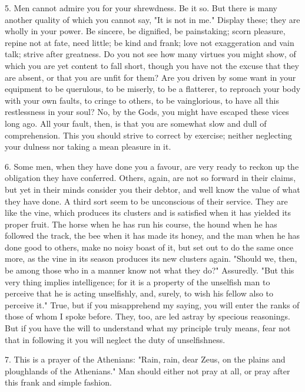 \documentclass{book}
\begin{document}
5. Men cannot admire you for your shrewdness. Be it so. But there is
many another quality of which you cannot say, "It is not in me."
Display these; they are wholly in your power. Be sincere, be
dignified, be painstaking; scorn pleasure, repine not at fate, need
little; be kind and frank; love not exaggeration and vain talk; strive
after greatness. Do you not see how many virtues you might show, of
which you are yet content to fall short, though you have not the
excuse that they are absent, or that you are unfit for them? Are you
driven by some want in your equipment to be querulous, to be miserly,
to be a flatterer, to reproach your body with your own faults, to
cringe to others, to be vainglorious, to have all this restlessness in
your soul? No, by the Gods, you might have escaped these vices long
ago. All your fault, then, is that you are somewhat slow and dull of
comprehension. This you should strive to correct by exercise; neither
neglecting your dulness nor taking a mean pleasure in it.

6. Some men, when they have done you a favour, are very ready to
reckon up the obligation they have conferred. Others, again, are not
so forward in their claims, but yet in their minds consider you their
debtor, and well know the value of what they have done. A third sort
seem to be unconscious of their service. They are like the vine, which
produces its clusters and is satisfied when it has yielded its proper
fruit. The horse when he has run his course, the hound when he has
followed the track, the bee when it has made its honey, and the man
when he has done good to others, make no noisy boast of it, but set
out to do the same once more, as the vine in its season produces its
new clusters again. "Should we, then, be among those who in a manner
know not what they do?" Assuredly. "But this very thing implies
intelligence; for it is a property of the unselfish man to perceive
that he is acting unselfishly, and, surely, to wish his fellow also to
perceive it." True, but if you misapprehend my saying, you will enter
the ranks of those of whom I spoke before. They, too, are led astray
by specious reasonings. But if you have the will to understand what my
principle truly means, fear not that in following it you will neglect
the duty of unselfishness.

7. This is a prayer of the Athenians: "Rain, rain, dear Zeus, on the
plains and ploughlands of the Athenians." Man should either not pray
at all, or pray after this frank and simple fashion.
\end{document}
